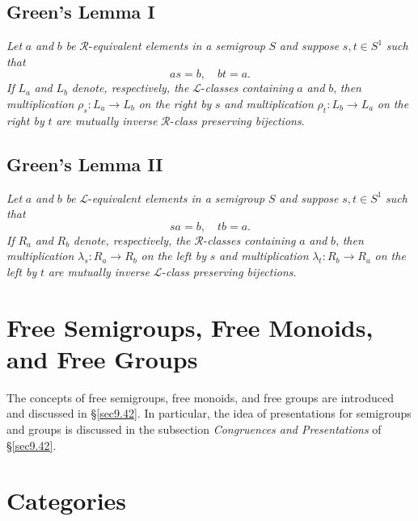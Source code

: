 \documentclass{surv-l}
\numberwithin{equation}{section}
\numberwithin{table}{section}
\numberwithin{figure}{section}
\theoremstyle{plain}
\theoremstyle{definition}
\begin{document}
\subsection{Green's Lemma I}\label{subsecA.77.1}

\emph{Let} $a$ \emph{and} $b$ \emph{be}
$\mathcal{R}$-\emph{equivalent elements in a semigroup} $S$
\emph{and suppose} $s, t\in S^{1}$ \emph{such that}
\[
as=b,\quad bt=a.
\]
\emph{If} $L_{a}$ \emph{and} $L_{b}$ \emph{denote, respectively,
the} $\mathcal{L}$-\emph{classes containing} $a$ \emph{and} $b$,
\emph{then multiplication} $\rho_{s} : L_{a}\rightarrow L_{b}$
\emph{on the right by} $s$ \emph{and multiplication} $\rho_{t} :
L_{b}\rightarrow L_{a}$ \emph{on the right by} $t$ \emph{are
mutually inverse} $\mathcal{R}$-\emph{class preserving
bijections}.

\subsection{Green's Lemma II}\label{subsecA.77.2}

\emph{Let} $a$ \emph{and} $b$ \emph{be}
$\mathcal{L}$-\emph{equivalent elements in a semigroup} $S$
\emph{and suppose} $s, t\in S^{1}$ \emph{such that}
\[
sa=b,\quad tb=a.
\]
\emph{If} $R_{a}$ \emph{and} $R_{b}$ \emph{denote, respectively,
the} $\mathcal{R}$-\emph{classes containing} $a$ \emph{and} $b$,
\emph{then multiplication} $\lambda_{s} : R_{a}\rightarrow R_{b}$
\emph{on the left by} $s$ \emph{and multiplication} $\lambda_{t} :
R_{b}\rightarrow R_{a}$ \emph{on the left by} $t$ \emph{are
mutually inverse} $\mathcal{L}$-\emph{class preserving
bijections}.

\section{Free Semigroups, Free Monoids, and Free Groups}\label{secA.78}

The concepts of free semigroups, free monoids, and free groups are
introduced and discussed in \S\ref{sec9.42}. In particular, the
idea of presentations for semigroups and groups is discussed in
the subsection \emph{Congruences and Presentations}
of \S\ref{sec9.42}.

\section{Categories}\label{secA.79}
\end{document}
